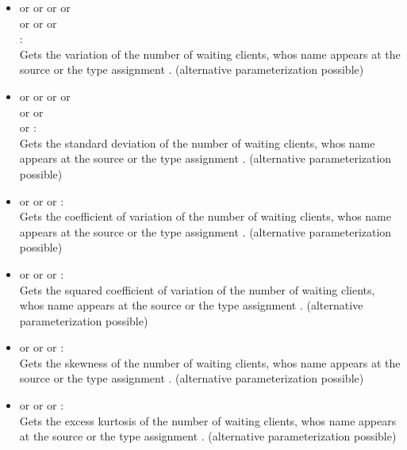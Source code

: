 \begin{itemize}
\item
{} or  or  or  or\\
 or  or  or\\
:\\
Gets the variation of the number of waiting clients, whos name appears at the source or the type assignment .
(alternative parameterization possible)

\item
{} or  or  or  or\\
 or  or\\
 or :\\
Gets the standard deviation of the number of waiting clients, whos name appears at the source or the type assignment .
(alternative parameterization possible)

\item
{} or  or  or :\\
Gets the coefficient of variation of the number of waiting clients, whos name appears at the source or the type assignment .
(alternative parameterization possible)

\item
{} or  or  or :\\
Gets the squared coefficient of variation of the number of waiting clients, whos name appears at the source or the type assignment .
(alternative parameterization possible)

\item
{} or  or  or :\\
Gets the skewness of the number of waiting clients, whos name appears at the source or the type assignment .
(alternative parameterization possible)

\item
{} or  or  or :\\
Gets the excess kurtosis of the number of waiting clients, whos name appears at the source or the type assignment .
(alternative parameterization possible)


\end{itemize}

